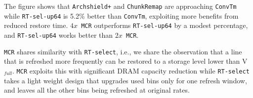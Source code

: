 The figure shows that {\tt Archshield+} and {\tt ChunkRemap} are approaching {\tt ConvTm} while {\tt RT-sel-up64} is 5.2\% better than {\tt ConvTm}, exploiting more benefits from reduced restore time.
{\tt $4x$ MCR} outperforms {\tt RT-sel-up64} by a modest percentage, and {\tt RT-sel-up64} works better than {\tt $2x$ MCR}.

{\tt MCR} shares similarity with {\tt RT-select}, i.e., we share the observation that a line that is refreshed more frequently can be restored to a storage level lower than V$_{full}$. {\tt MCR} exploits this with significant DRAM capacity reduction while {\tt RT-select} takes a light weight design that upgrades used bins only for one refresh window, and leaves all the other bins being refreshed at original rates. 






